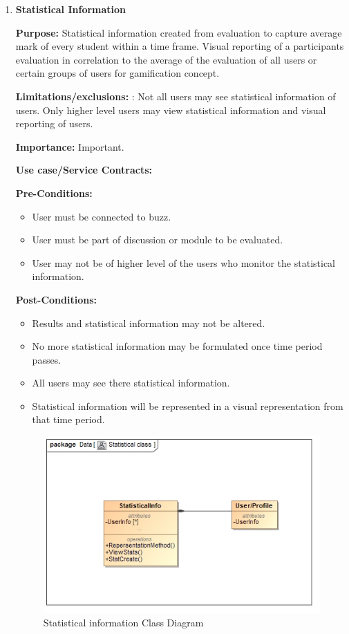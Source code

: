 \documentclass[11pt]{article}
\begin{document}
\begin{enumerate}
\newpage

\item \textbf{Statistical Information}

\textbf{Purpose:}
Statistical information created from evaluation to capture average mark of every student within a time frame. Visual reporting of a participants evaluation in correlation to the average of the evaluation of all users or certain groups of users for gamification concept.

\textbf{Limitations/exclusions:} : Not all users may see statistical information of users. Only higher level users may view statistical information and visual reporting of users.

 
\textbf{Importance:} Important.


\textbf{Use case/Service Contracts:} 

\textbf{Pre-Conditions: }
\begin{itemize}
\item User must be connected to buzz.

\item User must be part of discussion or module to be evaluated.

\item User may not be of higher level of the users who monitor the statistical information.


\end{itemize}
 

\textbf{Post-Conditions: }
\begin{itemize}

\item Results and statistical information may not be altered.
\item No more statistical information may be formulated once time period passes.
\item All users may see there statistical information.
\item Statistical information will be represented in a visual representation from that time period.



\end{itemize}

\graphicspath{ {../Diagrams/Matt/Class/} }
	  \begin{figure}[H]	
    	\includegraphics[scale=0.5]{StatisticalClass.jpg}
    	\caption{Statistical information Class Diagram}
	\end{figure}


\end{enumerate}
\end{document}
